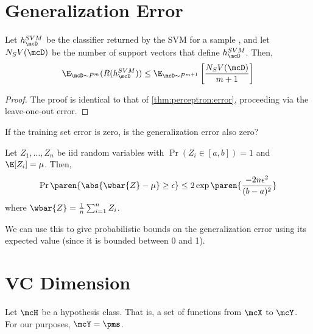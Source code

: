 \section{Generalization Error} \label{sec:svm:generalization}

\begin{theorem}[FOML 5.4] \label{thm:svm:error}
    Let $h_\mcD^{SVM}$ be the classifier returned by the SVM for a sample
    \mcD{}, and let $N_SV(\mcD)$ be the number of support vectors that
    define $h_\mcD^{SVM}$.
    Then, \[
        \E_{\mcD \sim P^m}(R(h_\mcD^{SVM}))
            \le \E_{\mcD \sim P^{m+1}}\left[\frac{N_SV(\mcD)}{m+1}\right]
    \]
\end{theorem}
\begin{proof}
    The proof is identical to that of \cref{thm:perceptron:error},
    proceeding via the leave-one-out error.
\end{proof}

If the training set error is zero, is the generalization error also zero?
\begin{fact}
    Let $Z_1, \dots, Z_n$ be iid random variables with
    $\Pr(Z_i \in [a, b]) = 1$ and $\E[Z_i] = \mu$.
    Then, \[
        \Pr\paren{\abs{\wbar{Z} - \mu} \ge \epsilon}
            \le 2\exp\paren{\frac{-2n\epsilon^2}{(b-a)^2}}
    \] where $\wbar{Z} = \frac{1}{n}\sum_{i=1}^n Z_i$.
\end{fact}
We can use this to give probabilistic bounds on the generalization error
using its expected value (since it is bounded between 0 and 1).

\section{VC Dimension} \label{sec:svm:vc}
Let $\mcH$ be a hypothesis class.
That is, a set of functions from $\mcX$ to $\mcY$.
For our purposes, $\mcY = \pms$.

